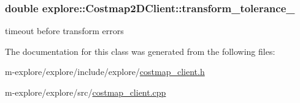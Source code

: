 \subsubsection[{\texorpdfstring{transform\+\_\+tolerance\+\_\+}{transform_tolerance_}}]{\setlength{\rightskip}{0pt plus 5cm}double explore\+::\+Costmap2\+D\+Client\+::transform\+\_\+tolerance\+\_\+\hspace{0.3cm}{\ttfamily [protected]}}\hypertarget{classexplore_1_1Costmap2DClient_a8df618a02b5a81b30e121cf509c0b804}{}\label{classexplore_1_1Costmap2DClient_a8df618a02b5a81b30e121cf509c0b804}


timeout before transform errors 



The documentation for this class was generated from the following files\+:\begin{DoxyCompactItemize}
\item 
m-\/explore/explore/include/explore/\hyperlink{costmap__client_8h}{costmap\+\_\+client.\+h}\item 
m-\/explore/explore/src/\hyperlink{costmap__client_8cpp}{costmap\+\_\+client.\+cpp}\end{DoxyCompactItemize}
